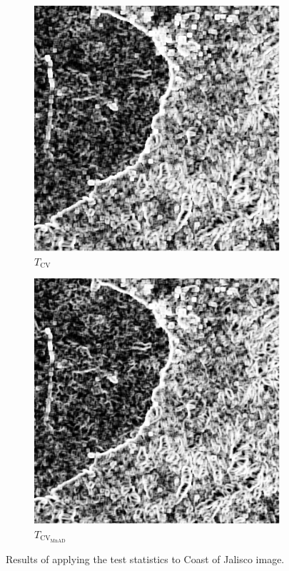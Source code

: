 \begin{figure}[H]
\begin{subfigure}[b]{0.3\textwidth}
    \includegraphics[width=\textwidth]{../../Figures/PNG/cv_mexico_512}
    \caption{$T_\text{CV}$}
    \label{fig:real_images_test_Mexico-2}
  \end{subfigure}
  \hfill
  \begin{subfigure}[b]{0.3\textwidth}
    \centering
    \includegraphics[width=\textwidth]{../../Figures/PNG/mnad_mexico_512}
    \caption{$T_{\text{CV}_{\text{MnAD}}}$}
    \label{fig:real_images_test_Mexico-3}
  \end{subfigure}
  \caption{Results of applying the test statistics to Coast of Jalisco image.}
  \label{fig:real_images_test_Mexico}
\end{figure}



